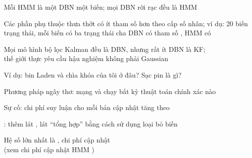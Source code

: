 \documentclass{article}
\begin{document}
\begin{huge}
\vspace{0.2in}





Mỗi HMM là một DBN một biến; mọi DBN rời rạc đều là HMM

\vspace*{0.2in}

\textwidth
{}

Các phần phụ thuộc thưa thớt \mat{$\Rightarrow$} có ít tham số hơn theo cấp số nhân;\al
ví dụ: 20 biến trạng thái, mỗi biến có ba trạng thái cha \al
DBN có tham số , HMM có 


Mọi mô hình bộ lọc Kalman đều là DBN, nhưng rất ít DBN là KF;\\
thế giới thực yêu cầu hậu nghiệm không phải Gaussian

Ví dụ: bin Laden và chìa khóa của tôi ở đâu? Sạc pin là gì?

\vspace{0.2in}






Phương pháp ngây thơ:  mạng và chạy bất kỳ thuật toán chính xác nào

\vspace*{0.2in}

\textwidth
{}

Sự cố: chi phí suy luận cho mỗi bản cập nhật tăng theo 

: thêm lát , lát ``tổng hợp''  bằng cách sử dụng loại bỏ biến

Hệ số lớn nhất là , chi phí cập nhật  \\
(xem chi phí cập nhật HMM )



\end{huge}
\end{document}
